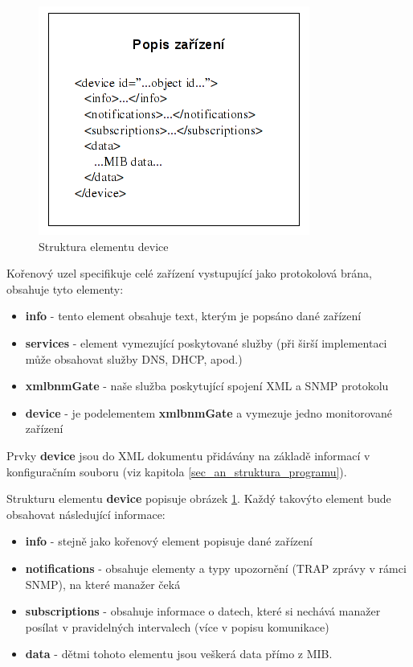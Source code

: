 \begin{figure}[htp]
	\begin{center}
		\includegraphics{obrazky/04_schema_device.png}
		\caption{Struktura elementu device}
		\label{obr_an_device_struktura}
	\end{center}
\end{figure}

Kořenový uzel specifikuje celé zařízení vystupující jako protokolová brána, obsahuje tyto elementy:
\begin{itemize}
	\item \textbf{info} - tento element obsahuje text, kterým je popsáno dané zařízení
	\item \textbf{services} - element vymezující poskytované služby (při širší implementaci může obsahovat služby DNS, DHCP, apod.)
	\item \textbf{xmlbnmGate} - naše služba poskytující spojení XML a SNMP protokolu
	\item \textbf{device} - je podelementem \textbf{xmlbnmGate} a vymezuje jedno monitorované zařízení
\end{itemize}

Prvky \textbf{device} jsou do XML dokumentu přidávány na základě informací v konfiguračním souboru (viz kapitola \ref{sec_an_struktura_programu}).

Strukturu elementu \textbf{device} popisuje obrázek \ref{obr_an_device_struktura}. Každý takovýto element bude obsahovat následující informace:
\begin{itemize}
	\item \textbf{info} - stejně jako kořenový element popisuje dané zařízení
	\item \textbf{notifications} - obsahuje elementy a typy upozornění (TRAP zprávy v rámci SNMP), na které manažer čeká
	\item \textbf{subscriptions} - obsahuje informace o datech, které si nechává manažer posílat v pravidelných intervalech (více v popisu komunikace)
	\item \textbf{data} - dětmi tohoto elementu jsou veškerá data přímo z MIB.
\end{itemize}

